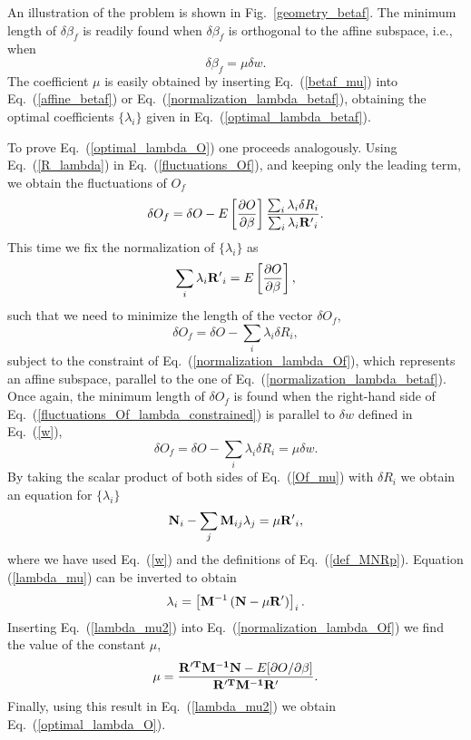 \documentclass[pre,twocolumn]{revtex4-2}
\begin{document}
An illustration of the problem is shown in Fig.~\ref{geometry_betaf}.
The minimum length of $\delta \beta_f$ is readily found when $\delta\beta_f$ is orthogonal to the affine subspace, i.e., when
\begin{equation}
  \delta\beta_f = \mu \delta w.
  \label{betaf_mu}
\end{equation}
The coefficient $\mu$ is easily obtained by inserting Eq.~(\ref{betaf_mu}) into Eq.~(\ref{affine_betaf}) or Eq.~(\ref{normalization_lambda_betaf}), obtaining the optimal coefficients $\{\lambda_i\}$ given in Eq.~(\ref{optimal_lambda_betaf}).

To prove Eq.~(\ref{optimal_lambda_O}) one proceeds analogously.
Using Eq.~(\ref{R_lambda}) in Eq.~(\ref{fluctuations_Of}), and keeping only the leading term, we obtain the fluctuations of $O_f$
\begin{equation}
    \delta O_f = \delta O - E\left[\frac{\partial O}{\partial\beta}\right] \frac{\sum_i \lambda_i \delta R_i}{\sum_i \lambda_i {\bf R'}_i}.
  \label{fluctuations_Of_lambda}
\end{equation}
This time we fix the normalization of $\{\lambda_i\}$ as
\begin{equation}
  \sum_i \lambda_i {\bf R'}_i = E\left[\frac{\partial O}{\partial\beta}\right],
  \label{normalization_lambda_Of}
\end{equation}
such that we need to minimize the length of the vector $\delta O_f$,
\begin{equation}
    \delta O_f = \delta O - \sum_i \lambda_i \delta R_i,
  \label{fluctuations_Of_lambda_constrained}
\end{equation}
subject to the constraint of Eq.~(\ref{normalization_lambda_Of}), which represents an affine subspace, parallel to the one of Eq.~(\ref{normalization_lambda_betaf}).
Once again, the minimum length of $\delta O_f$ is found when the right-hand side of Eq.~(\ref{fluctuations_Of_lambda_constrained}) is parallel to $\delta w$ defined in Eq.~(\ref{w}),
\begin{equation}
  \delta O_f = \delta O - \sum_i \lambda_i \delta R_i = \mu \delta{w}.
  \label{Of_mu}
\end{equation}
By taking the scalar product of both sides of Eq.~(\ref{Of_mu}) with $\delta R_i$ we obtain an equation for $\{\lambda_i\}$
\begin{equation}
  {\bf N}_i - \sum_j {\bf M}_{ij}\lambda_j = \mu {\bf R'}_i,
  \label{lambda_mu}
\end{equation}
where we have used Eq.~(\ref{w}) and the definitions of Eq.~(\ref{def_MNRp}).
Equation (\ref{lambda_mu}) can be inverted to obtain
\begin{equation}
  \lambda_i = \left[{\bf M}^{-1}\left({\bf N}-\mu {\bf R'}\right)\right]_i.
  \label{lambda_mu2}
\end{equation}
Inserting Eq.~(\ref{lambda_mu2}) into Eq.~(\ref{normalization_lambda_Of}) we find the value of the constant $\mu$,
\begin{equation}
  \mu = \frac{{\bf R'^T M^{-1}N}-E[\partial O/\partial\beta]}{\bf R'^TM^{-1}R'}.
  \label{mu_solution}
\end{equation}
Finally, using this result in Eq.~(\ref{lambda_mu2}) we obtain Eq.~(\ref{optimal_lambda_O}).


\end{document}
